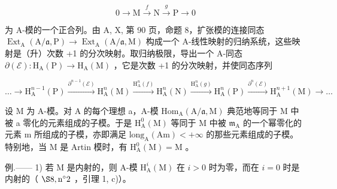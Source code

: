 \[
0 \longrightarrow \mathrm{M} \stackrel {f} {\longrightarrow} \mathrm{N} \stackrel {g} {\longrightarrow} \mathrm{P} \longrightarrow 0\tag{ℰ}
\]

为 A-模的一个正合列。由 A, X, 第 90 页，命题 8，扩张模的连接同态 \(\operatorname{Ext}_{\mathrm{A}}(\mathrm{A}/\mathfrak{a},\mathrm{P}) \longrightarrow \operatorname{Ext}_{\mathrm{A}}(\mathrm{A}/\mathfrak{a},\mathrm{M})\) 构成一个 A-线性映射的归纳系统，这些映射是（升）次数 +1 的分次映射。取归纳极限，导出一个 A-同态 \(\partial(\mathcal{E}): \mathrm{H}_{\mathrm{A}}(\mathrm{P}) \to \mathrm{H}_{\mathrm{A}}(\mathrm{M})\) ，它是次数 +1 的分次映射，并使同态序列

\[
\dots \longrightarrow \mathrm{H} _ {\mathrm{A}} ^ {n - 1} (\mathrm{P}) \xrightarrow {\partial^ {n - 1} (\mathcal {E})} \mathrm{H} _ {\mathrm{A}} ^ {n} (\mathrm{M}) \xrightarrow {\mathrm{H} _ {\mathrm{A}} ^ {n} (f)} \mathrm{H} _ {\mathrm{A}} ^ {n} (\mathrm{N}) \xrightarrow {\mathrm{H} _ {\mathrm{A}} ^ {n} (g)} \mathrm{H} _ {\mathrm{A}} ^ {n} (\mathrm{P}) \xrightarrow {\partial^ {n} (\mathcal {E})} \mathrm{H} _ {\mathrm{A}} ^ {n + 1} (\mathrm{M}) \longrightarrow \dots
\]

设 M 为 A-模。对 A 的每个理想 a，A-模 \(\mathrm{Hom}_{\mathrm{A}}(\mathrm{A}/\mathfrak{a},\mathrm{M})\) 典范地等同于 M 中被 a 零化的元素组成的子模。于是 \(\mathrm{H}_{\mathrm{A}}^{0}(\mathrm{M})\) 等同于 M 中被 \(\mathfrak{m}_{\mathrm{A}}\) 的一个幂零化的元素 m 所组成的子模，亦即满足 \(\mathrm{long}_{\mathrm{A}}(\mathrm{Am}) < +\infty\) 的那些元素组成的子模。特别地，当 M 是 Artin 模时，有 \(\mathrm{H}_{\mathrm{A}}^{0}(\mathrm{M}) = \mathrm{M}\) 。

例.—— 1) 若 M 是内射的，则 A-模 \(\mathrm{H}_{\mathrm{A}}^{i}(\mathrm{M})\) 在 \(i > 0\) 时为零，而在 \(i = 0\) 时是内射的（ \(\S 8, \mathrm{n}^{\circ}2\) ，引理 1, c)）。

